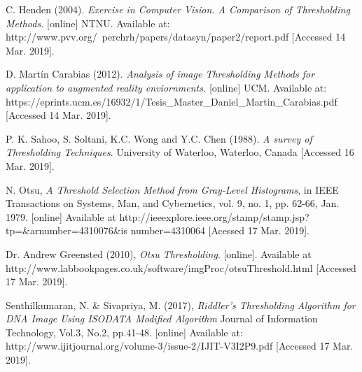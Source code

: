 \documentclass[12]{article}
\begin{document}
\begin{thebibliography}{100}

C. Henden (2004). \textit{ Exercise in Computer Vision. A Comparison of Thresholding Methods.} [online] NTNU. Available at: http://www.pvv.org/~perchrh/papers/datasyn/paper2/report.pdf [Accessed 14 Mar. 2019].


D. Martín Carabias (2012). \textit{Analysis of image Thresholding Methods for application to augmented reality enviornments.} [online] UCM. Available at: https://eprints.ucm.es/16932/1/Tesis\_Master\_Daniel\_Martin\_Carabias.pdf [Accessed 14 Mar. 2019].


P. K. Sahoo, S. Soltani, K.C. Wong and Y.C. Chen (1988). \textit{A survey of Thresholding Techniques}. University of Waterloo, Waterloo, Canada  [Accessed 16 Mar. 2019].

\bibitem{}N. Otsu, \textit{A Threshold Selection Method from Gray-Level Histograms}, in IEEE Transactions on Systems, Man, and Cybernetics, vol. 9, no. 1, pp. 62-66, Jan. 1979.
[online] Available at http://ieeexplore.ieee.org/stamp/stamp.jsp?tp=\&arnumber=4310076\&is
number=4310064 [Acessed 17 Mar. 2019].

\bibitem{}Dr. Andrew Greensted (2010), \textit{Otsu Thresholding}. [online]. Available at http://www.labbookpages.co.uk/software/imgProc/otsuThreshold.html [Accessed 17 Mar. 2019].

\bibitem{}Senthilkumaran,  N.  \&  Sivapriya,  M.  (2017),  \textit{Riddler's  Thresholding Algorithm  for  DNA  Image  Using  ISODATA  Modified  Algorithm} Journal  of Information Technology, Vol.3, No.2, pp.41-48. [online] Available at: http://www.ijitjournal.org/volume-3/issue-2/IJIT-V3I2P9.pdf [Accessed 17 Mar. 2019].

\end{thebibliography}
\end{document}
